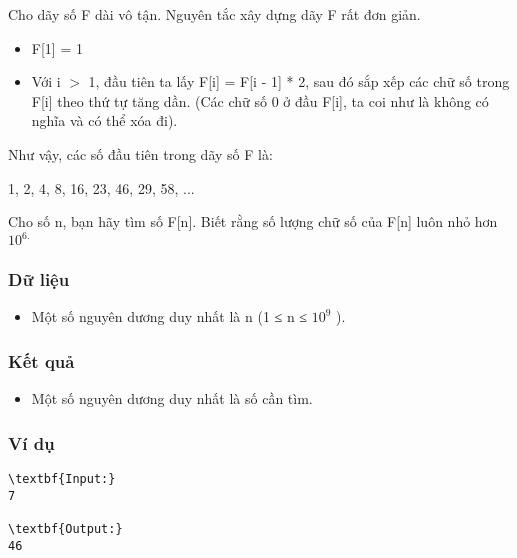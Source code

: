 



   Cho dãy số F dài vô tận. Nguyên tắc xây dựng dãy F rất đơn giản.  
\begin{itemize}
	\item     F[1] = 1   
	\item     Với i $>$ 1, đầu tiên ta lấy F[i] = F[i - 1] * 2, sau đó sắp xếp các chữ số trong F[i] theo thứ tự tăng dần. (Các chữ số 0 ở đầu F[i], ta coi như là không có nghĩa và có thể xóa đi).   
\end{itemize}

   Như vậy, các số đầu tiên trong dãy số F là:  

   1, 2, 4, 8, 16, 23, 46, 29, 58, ...  

   Cho số n, bạn hãy tìm số F[n]. Biết rằng số lượng chữ số của F[n] luôn nhỏ hơn $10^{6.}$

\subsubsection{   Dữ liệu  }
\begin{itemize}
	\item     Một số nguyên dương duy nhất là n (1 ≤ n ≤ $10^{9}$    ).   
\end{itemize}

\subsubsection{   Kết quả  }
\begin{itemize}
	\item     Một số nguyên dương duy nhất là số cần tìm.   
\end{itemize}

\subsubsection{   Ví dụ  }
\begin{verbatim}
\textbf{Input:}
7

\textbf{Output:}
46\end{verbatim}
